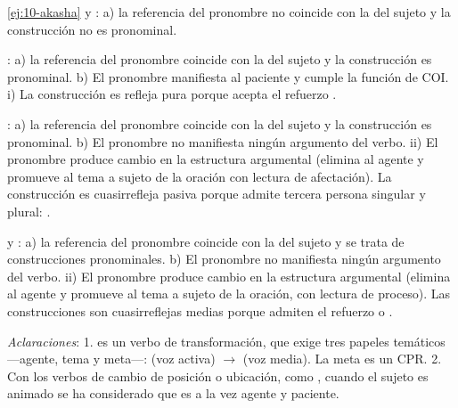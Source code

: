 \begin{solucion}{\ref{ej:10-akasha}}
 y : a) la referencia del pronombre no coincide con la del sujeto y
la construcción no es pronominal.

: a) la referencia del pronombre coincide con la del
sujeto y la construcción es pronominal. b) El pronombre manifiesta al paciente y
cumple la función de COI. i) La construcción es refleja pura porque acepta el
refuerzo .

: a) la
referencia del pronombre coincide con la del sujeto y la construcción es
pronominal. b) El pronombre no manifiesta ningún argumento del verbo. ii) El
pronombre produce cambio en la estructura argumental (elimina al agente y
promueve al tema a sujeto de la oración con lectura de afectación). La
construcción es cuasirrefleja pasiva porque admite tercera persona singular y
plural: .

 y : a) la referencia del
pronombre coincide con la del sujeto y se trata de construcciones pronominales.
b) El pronombre no manifiesta ningún argumento del verbo. ii) El pronombre
produce cambio en la estructura argumental (elimina al agente y promueve al tema
a sujeto de la oración, con lectura de proceso). Las construcciones son
cuasirreflejas medias porque admiten el refuerzo  o .

\textit{Aclaraciones}: 1.  es un verbo de transformación, que
exige tres papeles temáticos ---agente, tema y meta---:  (voz activa) $\rightarrow$  (voz media). La meta es un CPR. 2. Con los verbos de cambio de posición o
ubicación, como , cuando el sujeto es animado se ha considerado
que es a la vez agente y paciente.
\end{solucion}
